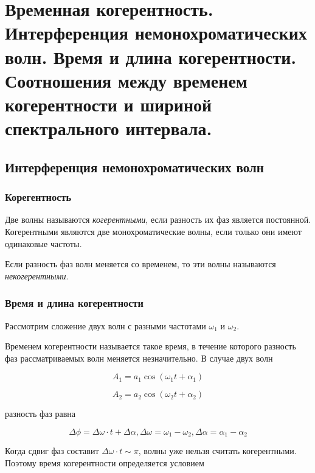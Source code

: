 

\section{Временная когерентность. Интерференция немонохроматических волн. Время и длина когерентности. Соотношения между временем когерентности и шириной спектрального интервала.}
\subsection{Интерференция немонохроматических волн}
\subsubsection{Корегентность}

Две волны называются \textit{когерентными}, если разность их фаз является постоянной. Когерентными являются две монохроматические волны, если только они имеют одинаковые частоты.

Если разность фаз волн меняется со временем, то эти волны называются \textit{некогерентными}.
\subsubsection{Время и длина когерентности}

Рассмотрим сложение двух волн с разными частотами $\omega_1$ и $\omega_2$.

Временем когерентности называется такое время, в течение которого разность фаз рассматриваемых волн меняется незначительно. В случае двух волн

\begin{equation*}
    A_1 = a_1 \cos(\omega_1 t + \alpha_1)
\end{equation*}

\begin{equation*}
    A_2 = a_2 \cos(\omega_2 t + \alpha_2)
\end{equation*}

разность фаз равна

\begin{equation*}
    \Delta \phi = \Delta \omega \cdot t + \Delta \alpha, \Delta \omega = \omega_1 - \omega_2, \Delta \alpha = \alpha_1 - \alpha_2
\end{equation*}

Когда сдвиг фаз составит $\Delta \omega \cdot t \sim \pi$, волны уже нельзя считать когерентными. Поэтому время когерентности определяется условием

